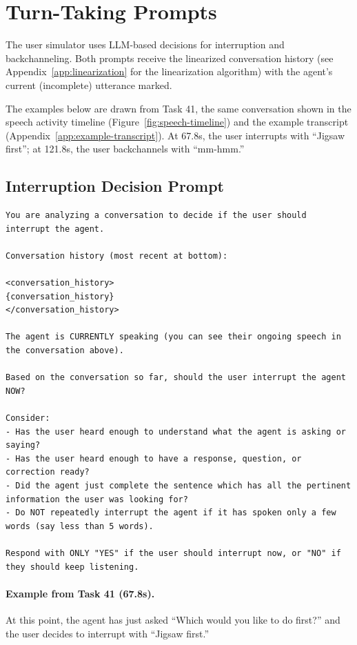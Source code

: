 \section{Turn-Taking Prompts}
\label{app:turn-taking-prompts}

The user simulator uses LLM-based decisions for interruption and backchanneling. Both prompts receive the linearized conversation history (see Appendix~\ref{app:linearization} for the linearization algorithm) with the agent's current (incomplete) utterance marked.

The examples below are drawn from Task 41, the same conversation shown in the speech activity timeline (Figure~\ref{fig:speech-timeline}) and the example transcript (Appendix~\ref{app:example-transcript}). At 67.8s, the user interrupts with ``Jigsaw first''; at 121.8s, the user backchannels with ``mm-hmm.''

\subsection{Interruption Decision Prompt}

\begin{lstlisting}
You are analyzing a conversation to decide if the user should interrupt the agent.

Conversation history (most recent at bottom):

<conversation_history>
{conversation_history}
</conversation_history>

The agent is CURRENTLY speaking (you can see their ongoing speech in the conversation above).

Based on the conversation so far, should the user interrupt the agent NOW?

Consider:
- Has the user heard enough to understand what the agent is asking or saying?
- Has the user heard enough to have a response, question, or correction ready?
- Did the agent just complete the sentence which has all the pertinent information the user was looking for?
- Do NOT repeatedly interrupt the agent if it has spoken only a few words (say less than 5 words).

Respond with ONLY "YES" if the user should interrupt now, or "NO" if they should keep listening.
\end{lstlisting}

\paragraph{Example from Task 41 (67.8s).} At this point, the agent has just asked ``Which would you like to do first?'' and the user decides to interrupt with ``Jigsaw first.''


